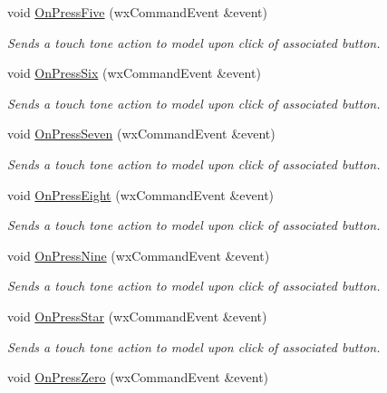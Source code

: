 \begin{CompactItemize}
void \hyperlink{classDialPad_1117cbca8f1075f55097b8a2c3859d7f}{OnPressFive} (wxCommandEvent \&event)
\begin{CompactList}\small\item\em Sends a touch tone action to model upon click of associated button. \item\end{CompactList}\item 
void \hyperlink{classDialPad_d6212054f7d5ff5a167376265b377bc7}{OnPressSix} (wxCommandEvent \&event)
\begin{CompactList}\small\item\em Sends a touch tone action to model upon click of associated button. \item\end{CompactList}\item 
void \hyperlink{classDialPad_fdfbc9b26eabdd85d512a21aaf9bf883}{OnPressSeven} (wxCommandEvent \&event)
\begin{CompactList}\small\item\em Sends a touch tone action to model upon click of associated button. \item\end{CompactList}\item 
void \hyperlink{classDialPad_a12bc9af8ce8a3fdad15fa55f70ea5c0}{OnPressEight} (wxCommandEvent \&event)
\begin{CompactList}\small\item\em Sends a touch tone action to model upon click of associated button. \item\end{CompactList}\item 
void \hyperlink{classDialPad_fd908470bb6b43597ba2169bfd6e0271}{OnPressNine} (wxCommandEvent \&event)
\begin{CompactList}\small\item\em Sends a touch tone action to model upon click of associated button. \item\end{CompactList}\item 
void \hyperlink{classDialPad_69cd65cf785135fdfa246882965b77ec}{OnPressStar} (wxCommandEvent \&event)
\begin{CompactList}\small\item\em Sends a touch tone action to model upon click of associated button. \item\end{CompactList}\item 
void \hyperlink{classDialPad_4e71463b25b3004ea30cfc64c298a03c}{OnPressZero} (wxCommandEvent \&event)

\end{CompactItemize}

